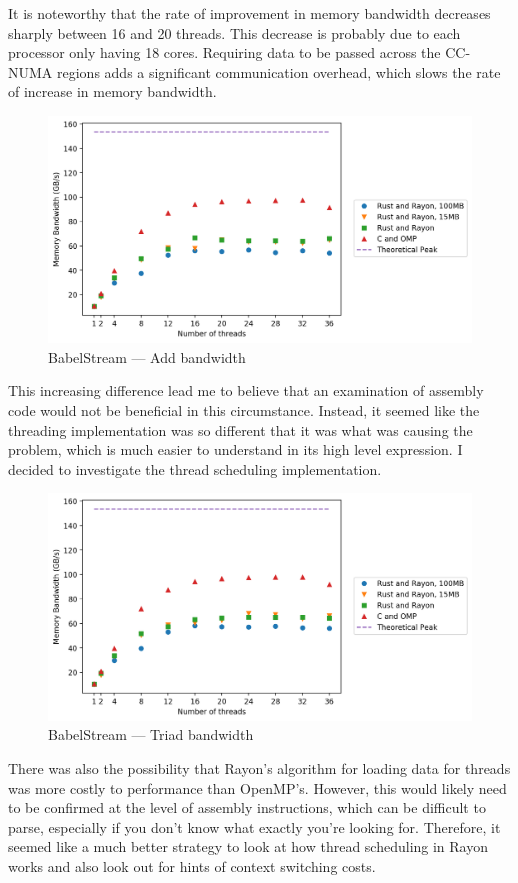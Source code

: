 It is noteworthy that the rate of improvement in memory bandwidth decreases sharply between 16 and 20 threads. This decrease is probably due to each processor only having 18 cores. Requiring data to be passed across the CC-NUMA regions adds a significant communication overhead, which slows the rate of increase in memory bandwidth.
\begin{figure}[h]
\centering
\includegraphics[width=.9\linewidth]{figs/babel/Add.png}
\caption{BabelStream --- Add bandwidth}\label{fig:babel-add}
\end{figure}

This increasing difference lead me to believe that an examination of assembly code would not be beneficial in this circumstance. Instead, it seemed like the threading implementation was so different that it was what was causing the problem, which is much easier to understand in its high level expression. I decided to investigate the thread scheduling implementation.

\begin{figure}[h]
\centering
\includegraphics[width=.9\linewidth]{figs/babel/Triad.png}
\caption{BabelStream --- Triad bandwidth}\label{fig:babel-triad}
\end{figure}

There was also the possibility that Rayon's algorithm for loading data for threads was more costly to performance than OpenMP's. However, this would likely need to be confirmed at the level of assembly instructions, which can be difficult to parse, especially if you don't know what exactly you're looking for. Therefore, it seemed like a much better strategy to look at how thread scheduling in Rayon works  and also look out for hints of context switching costs.

